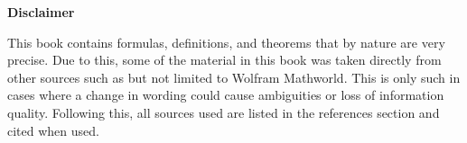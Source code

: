 \begin{center}
	\textbf{Disclaimer}
\end{center}

This book contains formulas, definitions, and theorems that by nature are very precise. Due to this, some of the material in this book was taken directly from other sources such as but not limited to Wolfram Mathworld. This is only such in cases where a change in wording could cause ambiguities or loss of information quality.  Following this, all sources used are listed in the references section and cited when used.
